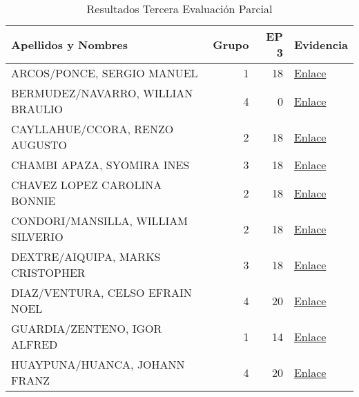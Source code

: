 \begin{table}[h]
	\caption{Resultados Tercera Evaluación Parcial}
	\begin{tabular}{lrrl}
		\hline
		\textbf{Apellidos y Nombres}                 & \textbf{Grupo} & \textbf{ EP 3} & \textbf{Evidencia} \\ \hline
		ARCOS/PONCE, SERGIO MANUEL          & 1                         & 18                       & \href{https://drive.google.com/drive/folders/1Xh0H-x6oXW8MLrL_3HSyH8S3zDMuTcyi?usp=sharing}{Enlace}    \\
		BERMUDEZ/NAVARRO, WILLIAN BRAULIO   & 4                         & 0                        & \href{https://drive.google.com/drive/folders/1Xh0H-x6oXW8MLrL_3HSyH8S3zDMuTcyi?usp=sharing}{Enlace}    \\
		CAYLLAHUE/CCORA, RENZO AUGUSTO      & 2                         & 18                       & \href{https://drive.google.com/drive/folders/1Xh0H-x6oXW8MLrL_3HSyH8S3zDMuTcyi?usp=sharing}{Enlace}    \\
		CHAMBI APAZA, SYOMIRA INES          & 3                         & 18                       & \href{https://drive.google.com/drive/folders/1Xh0H-x6oXW8MLrL_3HSyH8S3zDMuTcyi?usp=sharing}{Enlace}    \\
		CHAVEZ LOPEZ CAROLINA BONNIE        & 2                         & 18                       & \href{https://drive.google.com/drive/folders/1Xh0H-x6oXW8MLrL_3HSyH8S3zDMuTcyi?usp=sharing}{Enlace}    \\
		CONDORI/MANSILLA, WILLIAM SILVERIO  & 2                         & 18                       & \href{https://drive.google.com/drive/folders/1Xh0H-x6oXW8MLrL_3HSyH8S3zDMuTcyi?usp=sharing}{Enlace}    \\
		DEXTRE/AIQUIPA, MARKS CRISTOPHER    & 3                         & 18                       & \href{https://drive.google.com/drive/folders/1Xh0H-x6oXW8MLrL_3HSyH8S3zDMuTcyi?usp=sharing}{Enlace}    \\
		DIAZ/VENTURA, CELSO EFRAIN NOEL     & 4                         & 20                       & \href{https://drive.google.com/drive/folders/1Xh0H-x6oXW8MLrL_3HSyH8S3zDMuTcyi?usp=sharing}{Enlace}    \\
		GUARDIA/ZENTENO, IGOR ALFRED        & 1                         & 14                       & \href{https://drive.google.com/drive/folders/1Xh0H-x6oXW8MLrL_3HSyH8S3zDMuTcyi?usp=sharing}{Enlace}    \\
		HUAYPUNA/HUANCA, JOHANN FRANZ       & 4                         & 20                       & \href{https://drive.google.com/drive/folders/1Xh0H-x6oXW8MLrL_3HSyH8S3zDMuTcyi?usp=sharing}{Enlace}    \\

\end{tabular}
\end{table}
